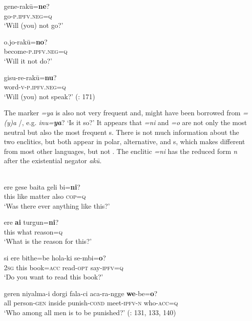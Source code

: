     \ex
    \gll gene-rak\=u=\textbf{{ne}}?\\
    go-\textsc{p}.\textsc{ipfv}.\textsc{neg}=\textsc{q}\\
    \glt ‘Will (you) not go?’
    
    \ex
    \gll o.jo-rak\=u=\textbf{{no}}?\\
    become-\textsc{p}.\textsc{ipfv}.\textsc{neg}=\textsc{q}\\
    \glt ‘Will it not do?’
    
    \ex
    \gll gisu-re-rak\=u=\textbf{{nu}}?\\
    word-\textsc{v}-\textsc{p}.\textsc{ipfv}.\textsc{neg}=\textsc{q}\\
    \glt ‘Will (you) not speak?’ (\citealt{Wuge1730,Wylie1855}: 171)\z\z

The marker \textit{=ya} is also not very frequent and, might have been borrowed from  \textit{=(y)a} /, e.g. \textit{inu=}\textbf{\textit{ya}}? ‘Is it so?’ It appears that \textit{=ni} and \textit{=o} are not only the most neutral but also the most frequent s. There is not much information about the two enclitics, but both appear in polar, alternative, and s, which makes  different from most other  languages, but not . The enclitic \textit{=ni} has the reduced form \textit{n} after the existential negator \textit{ak\=u}.

\ea%
    \label{ex:tungu:64}
    \\
    \ea
    \gll ere gese  baita  geli  bi=\textbf{{ni}}?\\
    this  like  matter  also  \textsc{cop}=\textsc{q}\\
    \glt ‘Was there ever anything like this?’
    
    \ex
    \gll ere \textbf{{ai}} turgun=\textbf{{ni}}?\\
    this  what  reason=\textsc{q}\\
    \glt ‘What is the reason for this?’
    
    \ex
    \gll si  ere  bithe=be  hola-ki    se-mbi=\textbf{{o}}?\\
    2\textsc{sg}  this  book=\textsc{acc}  read-\textsc{opt}  say-\textsc{ipfv}=\textsc{q}\\
    \glt ‘Do you want to read this book?’
    
    \ex
    \gll geren  niyalma-i  dorgi  fala-ci    aca-ra-ngge \textbf{{we}}{-be=}\textbf{{o}}?\\
    all  person-\textsc{gen}  inside  punish-\textsc{cond}  meet-\textsc{ipfv}-\textsc{n} who-\textsc{acc}=\textsc{q}\\
    \glt ‘Who among all men is to be punished?’ (\citealt{Wuge1730,Wylie1855}: 131, 133, 140)
    
